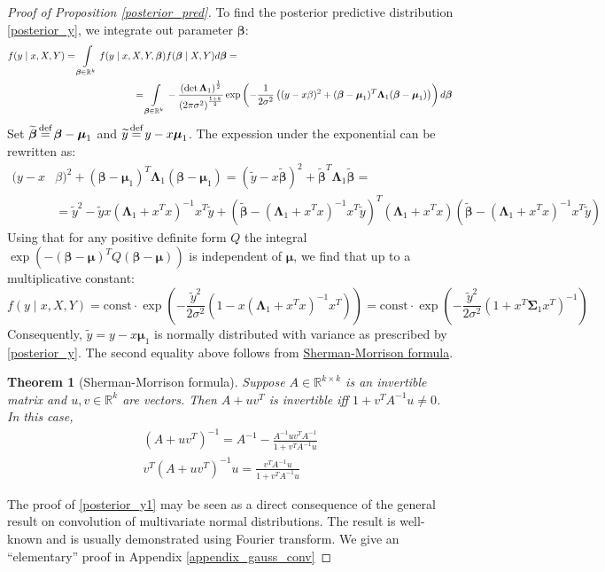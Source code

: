 \documentclass[10pt,fleqn]{amsart}
\newtheorem{theorem}{Theorem}[section]
\theoremstyle{definition}
\theoremstyle{remark}
\numberwithin{equation}{section}
\newcommand{\RR}{\mathbb{R}}
\newcommand{\eq}{\stackrel{\mathclap{\normalfont\text{def}}}{=}}
\newcommand{\const}{\text{const}}
\newcommand{\bbeta}{\boldsymbol{\beta}}
\newcommand{\mmu}{\boldsymbol{\mu}}
\newcommand{\SSigma}{\boldsymbol{\Sigma}}
\newcommand{\LLambda}{\boldsymbol{\Lambda}}
\begin{document}
\begin{proof}[Proof of Proposition \ref{posterior_pred}]
\noindent To find the posterior predictive distribution \ref{posterior_y}, we integrate out parameter $\bbeta$:
\begin{equation*}\begin{split}
f(y\mid x, X, Y)=\int\displaylimits_{\bbeta\in\RR^k}f(y\mid x,X,Y,\bbeta)&f(\bbeta\mid X,Y)d\bbeta=\\
=\int\displaylimits_{\bbeta\in\RR^k}&-\frac {\left(\det\LLambda_1\right)^{\frac 12}}{\left(2\pi\sigma^2\right)^{\frac{1+k}2}}
\exp\left(-\frac 1{2\sigma^2}\left((y-x\beta)^2+(\bbeta-\mmu_1)^T\LLambda_1(\bbeta-\mmu_1)\right)\right)d\bbeta
\end{split}\end{equation*}
Set $\widetilde{\bbeta}\eq\bbeta-\mmu_1$ and $\widetilde{y}\eq y-x\mmu_1$. The expession under the exponential can be rewritten as:
\begin{equation*}\begin{split}
    (y-x&\beta)^2+(\bbeta-\mmu_1)^T\LLambda_1(\bbeta-\mmu_1)=
    \left(\widetilde{y}-x\widetilde{\bbeta}\right)^2+\widetilde{\bbeta}^T\LLambda_1\widetilde{\bbeta}=\\
    &=\widetilde{y}^2-\widetilde{y}x\left(\LLambda_1+x^Tx\right)^{-1}x^T\widetilde{y}+
    \left(\widetilde{\bbeta}-\left(\LLambda_1+x^Tx\right)^{-1}x^T\widetilde{y}\right)^T\left(\LLambda_1+x^Tx\right)
    \left(\widetilde{\bbeta}-\left(\LLambda_1+x^Tx\right)^{-1}x^T\widetilde{y}\right)
\end{split}\end{equation*}
Using that for any positive definite form $Q$ the integral $\exp(-(\bbeta-\mmu)^TQ(\bbeta - \mmu))$ is independent of $\mmu$,
we find that up to a multiplicative constant:
\begin{equation*}
    f(y\mid x, X, Y)=\const\cdot \exp\left(-\frac {\widetilde{y}^2}{2\sigma^2}\left(1-x\left(\LLambda_1+x^Tx\right)^{-1}x^T\right)\right)=
    \const\cdot \exp\left(-\frac {\widetilde{y}^2}{2\sigma^2}\left(1+x^T\SSigma_1 x^T\right)^{-1}\right)
\end{equation*}
Consequently, $\widetilde{y}=y-x\mmu_1$ is normally distributed with variance as prescribed by \ref{posterior_y}.
The second equality above follows from \href{https://en.wikipedia.org/wiki/Sherman%E2%80%93Morrison_formula}{Sherman-Morrison formula}.
\begin{theorem}[Sherman-Morrison formula]
    Suppose $A\in\RR^{k\times k}$ is an invertible matrix and $u,v\in \RR^k$ are vectors. Then $A+uv^T$  is invertible iff $1+v^TA^{-1}u\neq 0$.
    In this case,
    \begin{align}
        \left(A+uv^T\right)^{-1}=A^{-1}-\frac{A^{-1}uv^TA^{-1}}{1+v^TA^{-1}u}\\
        v^T\left(A+uv^T\right)^{-1}u=\frac{v^TA^{-1}u}{1+v^TA^{-1}u}
    \end{align}
\end{theorem}
The proof of \ref{posterior_y1} may be seen as a direct consequence of the general result on convolution of multivariate normal distributions.
The result is well-known and is usually demonstrated using Fourier transform.
We give an ``elementary'' proof in Appendix \ref{appendix_gauss_conv}
\end{proof}
\end{document}
